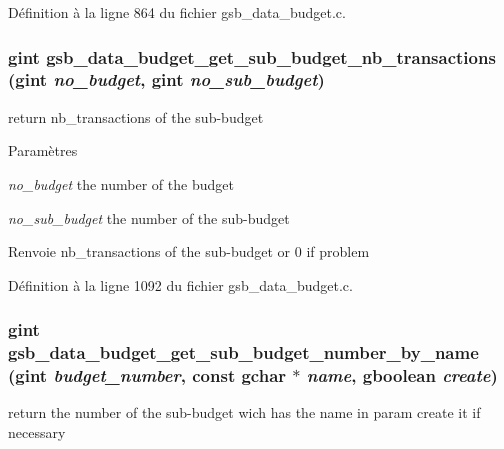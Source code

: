 Définition à la ligne 864 du fichier gsb\_\-data\_\-budget.c.

\subsubsection[{gsb\_\-data\_\-budget\_\-get\_\-sub\_\-budget\_\-nb\_\-transactions}]{\setlength{\rightskip}{0pt plus 5cm}gint gsb\_\-data\_\-budget\_\-get\_\-sub\_\-budget\_\-nb\_\-transactions (gint {\em no\_\-budget}, \/  gint {\em no\_\-sub\_\-budget})}\label{gsb__data__budget_8h_a4883bd0bfff37d0f4b520ed4dc0b69b4}
return nb\_\-transactions of the sub-\/budget


\begin{DoxyParams}{Paramètres}
\item[{\em no\_\-budget}]the number of the budget \item[{\em no\_\-sub\_\-budget}]the number of the sub-\/budget\end{DoxyParams}
\begin{DoxyReturn}{Renvoie}
nb\_\-transactions of the sub-\/budget or 0 if problem 
\end{DoxyReturn}


Définition à la ligne 1092 du fichier gsb\_\-data\_\-budget.c.

\subsubsection[{gsb\_\-data\_\-budget\_\-get\_\-sub\_\-budget\_\-number\_\-by\_\-name}]{\setlength{\rightskip}{0pt plus 5cm}gint gsb\_\-data\_\-budget\_\-get\_\-sub\_\-budget\_\-number\_\-by\_\-name (gint {\em budget\_\-number}, \/  const gchar $\ast$ {\em name}, \/  gboolean {\em create})}\label{gsb__data__budget_8h_a6d7e61d14b086448e7176f7681ce6087}
return the number of the sub-\/budget wich has the name in param create it if necessary


